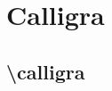 \documentclass[danish,a4paper,11pt]{scrartcl}
\begin{document}
\section*{Calligra}
\subsection*{\textbackslash calligra}
\normalfont\calligra

\newpage
\normalfont\calligra

\end{document}

